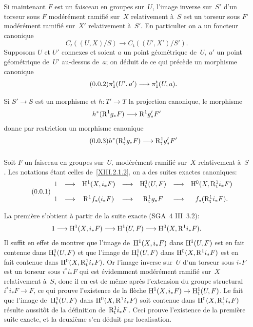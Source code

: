 Si maintenant $F$ est un faisceau en groupes sur~$U$, l'image inverse
sur~$S'$ d'un torseur sous $F$ mod\'er\'ement ramifi\'e sur~$X$
relativement \`a~$S$ est un torseur sous $F'$ mod\'er\'ement
ramifi\'e sur~$X'$ relativement \`a~$S'$. En particulier on a un
foncteur canonique
\begin{equation*}
\label{eq:XIII.2.1.5.1}
\tag{\thesubsubsection.1} C_t((U,X)/S)\to C_t((U',X')/S').
\end{equation*}
Supposons $U$ et $U'$ connexes et soient $a$ un point
g\'eom\'etrique de~$U$, $a'$ un point g\'eom\'etrique de~$U'$
au-dessus de~$a$; on d\'eduit de ce qui pr\'ec\`ede un morphisme
canonique
\begin{equation*}
\label{eq:XIII.2.1.5.2}
\tag{\thesubsubsection.2} \pi_1^{\tame}(U',a')\to\pi_1^{\tame}(U,a).
\end{equation*}

Si $S'\to S$ est un morphisme et $h\colon T'\to T$ la projection
canonique, le morphisme
$$
h^*(\R^1g_*F)\to\R^1g_*'F'
$$
donne par restriction un morphisme canonique
\begin{equation*}
\label{eq:XIII.2.1.5.3}
\tag{\thesubsubsection.3} h^*(\R^1_{\tame}g_*F)\to\R^1_{\tame}g_*'F'
\end{equation*}

\subsubsection{}
\label{XIII.2.1.6}
Soit
$F$ un faisceau en groupes sur~$U$, mod\'er\'ement
ramifi\'e sur~$X$ relativement \`a~$S$. Les notations \'etant
celles de~\ref{XIII.2.1.2}, on a des suites exactes canoniques:
\begin{equation*}
\label{eq:XIII.2.1.6.1}
\tag{\thesubsubsection.1}
\begin{array}{ccccccc}
1 & \longrightarrow & \H^1(X,i_*F)& \longrightarrow & \H^1_{\tame}(U,F) &
\longrightarrow & \H^0(X,\R^1_{\tame} i_*F)\\[10pt] 1 &
\longrightarrow & \R^1f_*(i_*F) & \longrightarrow & \R^1_{\tame}g_*F &
\longrightarrow & f_*(\R^1_{\tame}i_*F).\end{array}
\end{equation*}

La premi\`ere s'obtient \`a partir de la suite exacte
(SGA~4 III~3.2):
$$
1\to \H^1(X,i_*F)\to \H^1(U,F)\to
\H^0(X,\R^1i_*F).
$$
Il suffit en effet de montrer que l'image de~$\mathrm{H}^1(X,i_*F)$ dans
$\mathrm{H}^1(U,F)$ est en fait contenue dans $\mathrm{H}^1_{\mathrm{t}}(U,F)$ et que l'image de
$\mathrm{H}^1_{\mathrm{t}}(U,F)$ dans $\mathrm{H}^0(X,\mathrm{R}^1i_*F)$ est en fait contenue dans
$\mathrm{H}^0(X,\mathrm{R}^1_{\mathrm{t}}i_*F)$. Or l'image inverse sur~$U$ d'un torseur sous
$i_*F$ est un torseur sous $i^*i_*F$ qui est \'evidemment
mod\'er\'ement ramifi\'e sur~$X$ relativement \`a~$S$, donc il
en est de m\^eme apr\`es l'extension du groupe structural
$i^*i_*F\to F$, ce qui prouve l'existence de la fl\`eche
$\H^1(X,i_*F)\to\H^1_{\tame}(U,F)$. Le fait que l'image de~$\mathrm{H}^1_{\mathrm{t}}(U,F)$
dans $\mathrm{H}^0(X,\mathrm{R}^1i_*F)$ soit contenue dans $\mathrm{H}^0(X,\mathrm{R}^1_{\mathrm{t}}i_*F)$
r\'esulte aussit\^ot de la d\'efinition de~$\mathrm{R}^1_{\mathrm{t}}i_*F$. Ceci
prouve l'existence de la premi\`ere suite exacte, et la deuxi\`eme
s'en d\'eduit par localisation.

